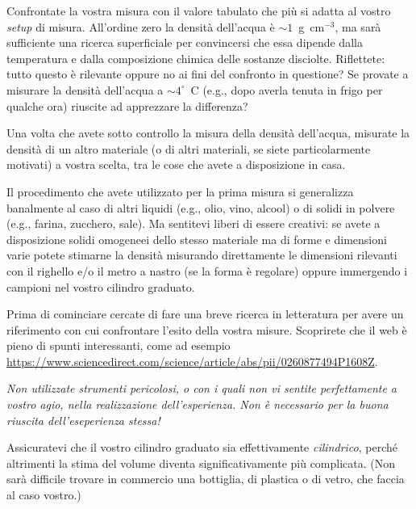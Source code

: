 \documentclass{lab1-article}
\begin{document}
\begin{article}

Confrontate la vostra misura con il valore tabulato che pi\`u si adatta al
vostro \emph{setup} di misura. All'ordine zero la densit\`a dell'acqua \`e
$\sim 1$~g~cm$^{-3}$, ma sar\`a sufficiente una ricerca superficiale per
convincersi che essa dipende dalla temperatura e dalla composizione chimica
delle sostanze disciolte. Riflettete: tutto questo \`e rilevante oppure no ai
fini del confronto in questione? Se provate a misurare la densit\`a dell'acqua
a $\sim 4^\circ$~C (e.g., dopo averla tenuta in frigo per qualche ora) riuscite
ad apprezzare la differenza?



Una volta che avete sotto controllo la misura della densit\`a dell'acqua,
misurate la densit\`a di un altro materiale (o di altri materiali, se siete
particolarmente motivati) a vostra scelta, tra le cose che avete a disposizione
in casa.

Il procedimento che avete utilizzato per la prima misura si generalizza
banalmente al caso di altri liquidi (e.g., olio, vino, alcool) o di solidi in
polvere (e.g., farina, zucchero, sale). Ma sentitevi liberi di essere creativi:
se avete a disposizione solidi omogeneei dello stesso materiale ma di forme e
dimensioni varie potete stimarne la densit\`a misurando direttamente le
dimensioni rilevanti con il righello e/o il metro a nastro (se la forma \`e
regolare) oppure immergendo i campioni nel vostro cilindro graduato.

Prima di cominciare cercate di fare una breve ricerca in letteratura per avere
un riferimento con cui confrontare l'esito della vostra misure. Scoprirete che
il web \`e pieno di spunti interessanti, come ad esempio
\url{https://www.sciencedirect.com/science/article/abs/pii/0260877494P1608Z}.


\secconsiderations

\emph{Non utilizzate strumenti pericolosi, o con i quali non vi sentite
  perfettamente a vostro agio, nella realizzazione dell'esperienza. Non \`e
  necessario per la buona riuscita dell'eseperienza stessa!}

Assicuratevi che il vostro cilindro graduato sia effettivamente \emph{cilindrico},
perch\'e altrimenti la stima del volume diventa significativamente pi\`u
complicata. (Non sar\`a difficile trovare in commercio una bottiglia, di plastica
o di vetro, che faccia al caso vostro.)


\end{article}
\end{document}
